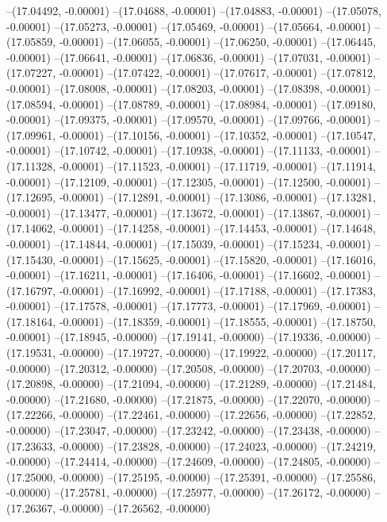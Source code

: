 --(17.04492, -0.00001)
--(17.04688, -0.00001)
--(17.04883, -0.00001)
--(17.05078, -0.00001)
--(17.05273, -0.00001)
--(17.05469, -0.00001)
--(17.05664, -0.00001)
--(17.05859, -0.00001)
--(17.06055, -0.00001)
--(17.06250, -0.00001)
--(17.06445, -0.00001)
--(17.06641, -0.00001)
--(17.06836, -0.00001)
--(17.07031, -0.00001)
--(17.07227, -0.00001)
--(17.07422, -0.00001)
--(17.07617, -0.00001)
--(17.07812, -0.00001)
--(17.08008, -0.00001)
--(17.08203, -0.00001)
--(17.08398, -0.00001)
--(17.08594, -0.00001)
--(17.08789, -0.00001)
--(17.08984, -0.00001)
--(17.09180, -0.00001)
--(17.09375, -0.00001)
--(17.09570, -0.00001)
--(17.09766, -0.00001)
--(17.09961, -0.00001)
--(17.10156, -0.00001)
--(17.10352, -0.00001)
--(17.10547, -0.00001)
--(17.10742, -0.00001)
--(17.10938, -0.00001)
--(17.11133, -0.00001)
--(17.11328, -0.00001)
--(17.11523, -0.00001)
--(17.11719, -0.00001)
--(17.11914, -0.00001)
--(17.12109, -0.00001)
--(17.12305, -0.00001)
--(17.12500, -0.00001)
--(17.12695, -0.00001)
--(17.12891, -0.00001)
--(17.13086, -0.00001)
--(17.13281, -0.00001)
--(17.13477, -0.00001)
--(17.13672, -0.00001)
--(17.13867, -0.00001)
--(17.14062, -0.00001)
--(17.14258, -0.00001)
--(17.14453, -0.00001)
--(17.14648, -0.00001)
--(17.14844, -0.00001)
--(17.15039, -0.00001)
--(17.15234, -0.00001)
--(17.15430, -0.00001)
--(17.15625, -0.00001)
--(17.15820, -0.00001)
--(17.16016, -0.00001)
--(17.16211, -0.00001)
--(17.16406, -0.00001)
--(17.16602, -0.00001)
--(17.16797, -0.00001)
--(17.16992, -0.00001)
--(17.17188, -0.00001)
--(17.17383, -0.00001)
--(17.17578, -0.00001)
--(17.17773, -0.00001)
--(17.17969, -0.00001)
--(17.18164, -0.00001)
--(17.18359, -0.00001)
--(17.18555, -0.00001)
--(17.18750, -0.00001)
--(17.18945, -0.00000)
--(17.19141, -0.00000)
--(17.19336, -0.00000)
--(17.19531, -0.00000)
--(17.19727, -0.00000)
--(17.19922, -0.00000)
--(17.20117, -0.00000)
--(17.20312, -0.00000)
--(17.20508, -0.00000)
--(17.20703, -0.00000)
--(17.20898, -0.00000)
--(17.21094, -0.00000)
--(17.21289, -0.00000)
--(17.21484, -0.00000)
--(17.21680, -0.00000)
--(17.21875, -0.00000)
--(17.22070, -0.00000)
--(17.22266, -0.00000)
--(17.22461, -0.00000)
--(17.22656, -0.00000)
--(17.22852, -0.00000)
--(17.23047, -0.00000)
--(17.23242, -0.00000)
--(17.23438, -0.00000)
--(17.23633, -0.00000)
--(17.23828, -0.00000)
--(17.24023, -0.00000)
--(17.24219, -0.00000)
--(17.24414, -0.00000)
--(17.24609, -0.00000)
--(17.24805, -0.00000)
--(17.25000, -0.00000)
--(17.25195, -0.00000)
--(17.25391, -0.00000)
--(17.25586, -0.00000)
--(17.25781, -0.00000)
--(17.25977, -0.00000)
--(17.26172, -0.00000)
--(17.26367, -0.00000)
--(17.26562, -0.00000)
